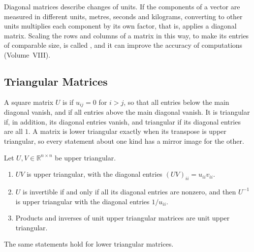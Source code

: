 Diagonal matrices describe changes of units. If the components of a vector are measured in different units, metres, seconds and kilograms, converting to other units multiplies each component by its own factor, that is, applies a diagonal matrix. Scaling the rows and columns of a matrix in this way, to make its entries of comparable size, is called , and it can improve the accuracy of computations (Volume~VIII).

\subsection{Triangular Matrices}

A square matrix $U$ is  if $u_{ij}=0$ for $i>j$, so that all entries below the main diagonal vanish, and  if all entries above the main diagonal vanish. It is  triangular if, in addition, its diagonal entries vanish, and  triangular if its diagonal entries are all $1$. A matrix is lower triangular exactly when its transpose is upper triangular, so every statement about one kind has a mirror image for the other.

\begin{theorem}
\label{thm:triangular}
Let $U,V\in\mathbb R^{n\times n}$ be upper triangular.
\begin{enumerate}
\item $UV$ is upper triangular, with the diagonal entries $(UV)_{ii}=u_{ii}v_{ii}$.
\item $U$ is invertible if and only if all its diagonal entries are nonzero, and then $U^{-1}$ is upper triangular with the diagonal entries $1/u_{ii}$.
\item Products and inverses of unit upper triangular matrices are unit upper triangular.
\end{enumerate}
The same statements hold for lower triangular matrices.
\end{theorem}

